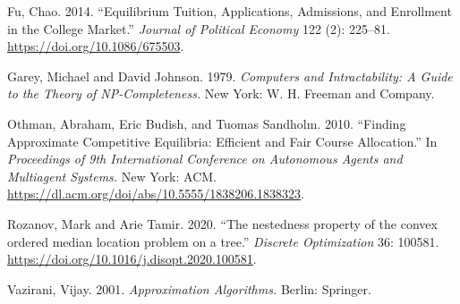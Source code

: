 \documentclass[12pt]{article} %
\theoremstyle{definition}
\theoremstyle{definition}
\begin{document}
Fu, Chao. 2014. ``Equilibrium Tuition, Applications, Admissions, and Enrollment in the College Market.'' \emph{Journal of Political Economy} 122 (2): 225--81. \url{https://doi.org/10.1086/675503}. 

Garey, Michael and David Johnson. 1979. \emph{Computers and Intractability: A Guide to the Theory of NP-Completeness.} New York: W. H. Freeman and Company. 

Othman, Abraham, Eric Budish, and Tuomas Sandholm. 2010. ``Finding Approximate Competitive Equilibria: Efficient and Fair
Course Allocation.'' In \emph{Proceedings of 9th International Conference on Autonomous Agents and Multiagent Systems.} New York: ACM. \url{https://dl.acm.org/doi/abs/10.5555/1838206.1838323}.

Rozanov, Mark and Arie Tamir. 2020. ``The nestedness property of the convex ordered median location problem on a tree.'' \emph{Discrete Optimization} 36: 100581. \url{https://doi.org/10.1016/j.disopt.2020.100581}.

Vazirani, Vijay. 2001. \emph{Approximation Algorithms.} Berlin: Springer. 
\end{document}

